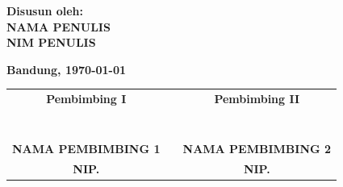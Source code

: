 \begin{center}
\textbf{Disusun oleh:}\\

\MakeUppercase{\textbf{NAMA PENULIS}}\\

\MakeUppercase{\textbf{NIM PENULIS}}\\

\vfill

\textbf{Bandung, \today}\\

\vspace{1em}

\begin{tabular}{ccc}

    \textbf{Pembimbing I} && \textbf{Pembimbing II} \\

     && \\
     && \\
     && \\
     && \\
     && \\
     && \\
     && \\

    \MakeUppercase{\textbf{Nama Pembimbing 1}}
    &
    \hfill
    &
    \MakeUppercase{\textbf{Nama Pembimbing 2}}
    \\
    

    \MakeUppercase{\textbf{NIP. }}
    &
    \hfill
    &
    \MakeUppercase{\textbf{NIP. }}
    \\


\end{tabular}

\end{center}
